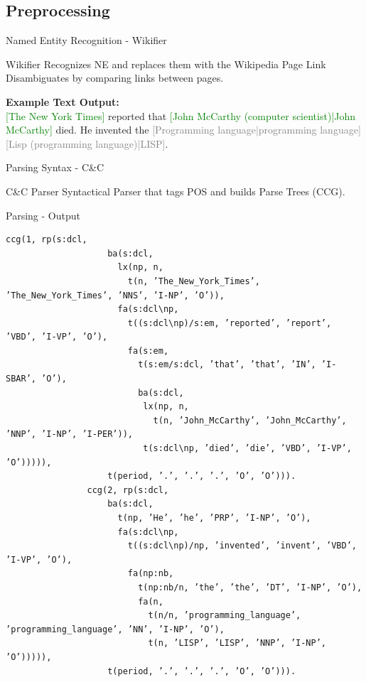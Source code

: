 \documentclass[11pt]{beamer}
\begin{document}
	\subsection{Preprocessing}
		\begin{frame}{Named Entity Recognition - Wikifier}
			\begin{block}{Wikifier}
				Recognizes NE and replaces them with the Wikipedia Page Link\\
				Disambiguates by comparing links between pages.
			\end{block}
			\vspace{15pt}
			\textbf{Example Text Output:}\\
			\textcolor{green}{[The New York Times]} reported that \textcolor{green}{[John McCarthy (computer scientist)|John McCarthy]} died. He invented the \textcolor{gray}{[Programming language|programming language]} \textcolor{gray}{[Lisp (programming language)|LISP]}.
		\end{frame}
		
		\begin{frame}{Parsing Syntax - C\&C}
			\begin{block}{C\&C Parser}
				Syntactical Parser that tags POS and builds Parse Trees (CCG).
			\end{block}
		\end{frame}
		
		\begin{frame}[fragile]{Parsing - Output}
			\begin{Verbatim}[fontsize=\tiny]
				ccg(1, rp(s:dcl,
				    ba(s:dcl,
				      lx(np, n,
				        t(n, ’The_New_York_Times’, ’The_New_York_Times’, ’NNS’, ’I-NP’, ’O’)),
				      fa(s:dcl\np,
				        t((s:dcl\np)/s:em, ’reported’, ’report’, ’VBD’, ’I-VP’, ’O’),
				        fa(s:em,
				          t(s:em/s:dcl, ’that’, ’that’, ’IN’, ’I-SBAR’, ’O’),
				          ba(s:dcl,
				           lx(np, n,
				             t(n, ’John_McCarthy’, ’John_McCarthy’, ’NNP’, ’I-NP’, ’I-PER’)),
				           t(s:dcl\np, ’died’, ’die’, ’VBD’, ’I-VP’, ’O’))))),
				    t(period, ’.’, ’.’, ’.’, ’O’, ’O’))).				
				ccg(2, rp(s:dcl,
				    ba(s:dcl,
				      t(np, ’He’, ’he’, ’PRP’, ’I-NP’, ’O’),
				      fa(s:dcl\np,
				        t((s:dcl\np)/np, ’invented’, ’invent’, ’VBD’, ’I-VP’, ’O’),
				        fa(np:nb,
				          t(np:nb/n, ’the’, ’the’, ’DT’, ’I-NP’, ’O’),
				          fa(n,
				            t(n/n, ’programming_language’, ’programming_language’, ’NN’, ’I-NP’, ’O’),
				            t(n, ’LISP’, ’LISP’, ’NNP’, ’I-NP’, ’O’))))),
				    t(period, ’.’, ’.’, ’.’, ’O’, ’O’))).
			\end{Verbatim}
		\end{frame}
		
\end{document}
